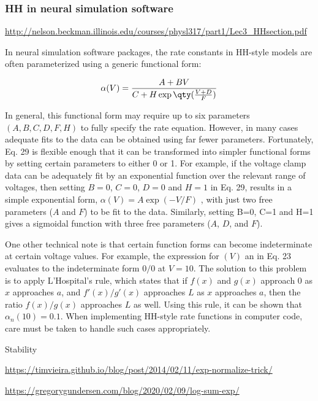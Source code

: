 \subsubsection{HH in neural simulation software}

\url{http://nelson.beckman.illinois.edu/courses/physl317/part1/Lec3_HHsection.pdf}

In neural simulation software packages, the rate constants in HH-style models are often parameterized using a generic functional form:

\begin{equation*}
    \alpha (V) = \frac{A + BV}{C + H \exp \qty(\frac{V+D}{F})}
\end{equation*}

In general, this functional form may require up to six parameters $(A, B, C, D, F, H)$ to fully specify the rate equation. However, in many cases adequate fits to the data can be obtained using far fewer parameters. Fortunately, Eq. 29 is flexible enough that it can be transformed into simpler functional forms by setting certain parameters to either 0 or 1. For example, if the voltage clamp data can be adequately fit by an exponential function over the relevant range of voltages, then setting $B=0$, $C=0$, $D=0$ and $H=1$ in Eq. 29, results in a simple exponential form,
$\alpha(V) = A \exp(-V / F)$ , with just two free parameters ($A$ and $F$) to be fit to the data. Similarly, setting B=0, C=1 and H=1 gives a sigmoidal function with three free parameters ($A$, $D$, and $F$).

One other technical note is that certain function forms can become indeterminate at
certain voltage values. For example, the expression for $(V)$ an in Eq. 23 evaluates to the indeterminate form $0/0$ at $V=10$. The solution to this problem is to apply L’Hospital’s rule, which states that if $f(x)$ and $g(x)$ approach $0$ as $x$ approaches $a$, and $f'(x)/ g'( x)$ approaches $L$ as $x$ approaches $a$, then the ratio $f (x)/ g( x)$ approaches $L$ as well. Using this rule, it can be shown
that $\alpha_n (10) = 0.1$. When implementing HH-style rate functions in computer code, care must be taken to handle such cases appropriately.

Stability

\url{https://timvieira.github.io/blog/post/2014/02/11/exp-normalize-trick/}

\url{https://gregorygundersen.com/blog/2020/02/09/log-sum-exp/}


